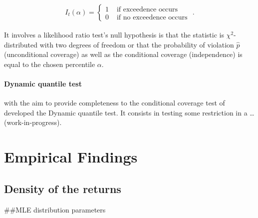 \documentclass[a4paper, twoside]{templates/ociamthesis}
\begin{document}
\begin{align}
I_{t}(\alpha)=\left\{\begin{array}{ll}
1 & \text { if exceedence occurs } \\
0 & \text { if no exceedence occurs }
\end{array} .\right.
\label{eq:ccov}
\end{align}

It involves a likelihood ratio test's null hypothesis is that the statistic is \(\chi^2\)-distributed with two degrees of freedom or that the probability of violation \(\hat p\) (unconditional coverage) as well as the conditional coverage (independence) is equal to the chosen percentile \(\alpha\).

\hypertarget{dynamic-quantile-test}{%
\subsubsection{Dynamic quantile test}\label{dynamic-quantile-test}}

\textcite{engle1999} with the aim to provide completeness to the conditional coverage test of \textcite{christoffersen2001} developed the Dynamic quantile test. It consists in testing some restriction in a \ldots(work-in-progress).

\clearpage

\hypertarget{analysis}{%
\chapter{Empirical Findings}\label{analysis}}

\minitoc 

\hypertarget{density-of-the-returns}{%
\section{Density of the returns}\label{density-of-the-returns}}

\#\#MLE distribution parameters
\end{document}
